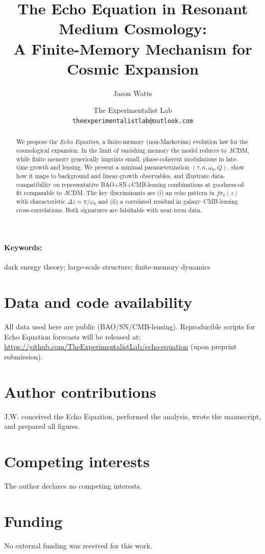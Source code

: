\documentclass[11pt,a4paper]{article}
\title{\textbf{The Echo Equation in Resonant Medium Cosmology:}\\
A Finite-Memory Mechanism for Cosmic Expansion}
\author{Jason Watts}
\date{{\small The Experimentalist Lab\\[1ex]
\texttt{theexperimentalistlab@outlook.com}}}
\begin{document}
\maketitle

\begin{abstract}
We propose the \emph{Echo Equation}, a finite-memory (non-Markovian) evolution law for the cosmological expansion. In the limit of vanishing memory the model reduces to $\Lambda$CDM, while finite memory generically imprints small, phase-coherent modulations in late-time growth and lensing. We present a minimal parameterization $(\tau,\kappa,\omega_0,Q)$, show how it maps to background and linear-growth observables, and illustrate data-compatibility on representative BAO+SN+CMB-lensing combinations at goodness-of-fit comparable to $\Lambda$CDM. The key discriminants are (i) an echo pattern in $f\sigma_8(z)$ with characteristic $\Delta z \simeq \pi/\omega_0$ and (ii) a correlated residual in galaxy–CMB-lensing cross-correlations. Both signatures are falsifiable with near-term data.
\end{abstract}

\paragraph*{Keywords:} dark energy theory; large-scale structure; finite-memory dynamics

\tableofcontents









\appendix


\section*{Data and code availability}
All data used here are public (BAO/SN/CMB-lensing). Reproducible scripts for Echo Equation forecasts will be released at:\\ \url{https://github.com/TheExperimentalistLab/echo-equation} (upon preprint submission).

\section*{Author contributions}
J.W. conceived the Echo Equation, performed the analysis, wrote the manuscript, and prepared all figures.

\section*{Competing interests}
The author declares no competing interests.

\section*{Funding}
No external funding was received for this work.



\end{document}
